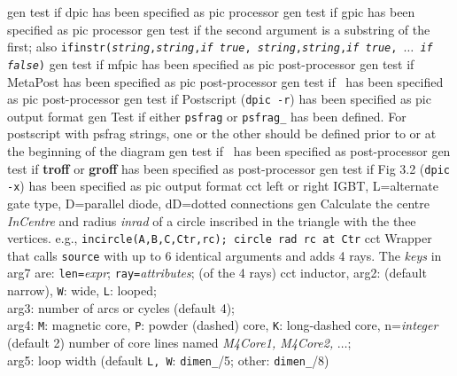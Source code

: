 %
  {gen}%
  {test if dpic has been specified as pic processor}%
%
  {gen}%
  {test if gpic has been specified as pic processor}%
%
  {gen}%
  {test if the second argument is a substring of the first; also
  {\tt ifinstr({\sl string},{\sl string},{\sl if true},{\sl
  string},{\sl string},{\sl if true}, $\ldots$ {\sl if false})} }%
%
  {gen}%
  {test if mfpic has been specified as pic post-processor}%
%
  {gen}%
  {test if MetaPost has been specified as pic post-processor}%
%
  {gen}%
  {test if \TPGF~has been specified as pic post-processor}%
%
  {gen}%
  {test if Postscript ({\tt dpic -r}) has been specified as pic output format}%
%
  {gen}%
  {Test if either {\tt psfrag} or {\tt psfrag\_} has been defined. For
   postscript with psfrag strings, one or the other should be defined
   prior to or at the beginning of the diagram}%
%
  {gen}%
  {test if \PSTricks~has been specified as post-processor}%
%
  {gen}%
  {test if {\bf troff} or {\bf groff} has been specified as post-processor}%
%
  {gen}%
  {test if Fig 3.2 ({\tt dpic -x}) has been specified as pic output format}%
%
  {cct}%
  {left or right IGBT, L=alternate gate type, D=parallel diode,
   dD=dotted connections }%
%
  {gen}%
  {Calculate the centre {\sl InCentre} and radius {\sl inrad}
   of a circle inscribed in the triangle with the thee vertices. e.g.,
   {\tt incircle(A,B,C,Ctr,rc); circle rad rc at Ctr}}%
%
  {cct}%
  {Wrapper that calls {\tt source} with up to 6 identical
    arguments and adds 4 rays.
    The {\sl keys} in arg7 are: {\tt len=}{\sl expr};
        {\tt ray=}{\sl attributes}; (of the 4 rays)}%
%
  {cct}%
  {inductor, arg2: (default narrow), {\tt W}: wide, {\tt L}: looped;\\
   arg3: number of arcs or cycles (default 4);\\
   arg4:
   {\tt M}: magnetic core,
   {\tt P}: powder (dashed) core,
   {\tt K}: long-dashed core,
     n={\sl integer} (default 2) number of core lines named
     {\sl M4Core1, M4Core2,} $\ldots$;\\
   arg5: loop width (default {\tt L, W}: {\tt dimen\_}/5;
     other: {\tt dimen\_}/8)
   }%
